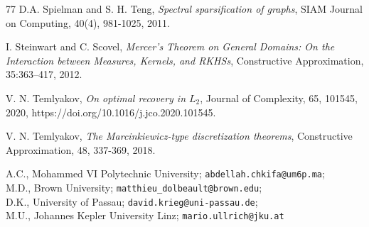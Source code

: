 \documentclass[a4paper,11pt]{article}
\renewcommand{\(}{\left (}
\renewcommand{\)}{\right )}
\newcommand{\<}{\langle}
\renewcommand{\>}{\rangle}
\theoremstyle{definition}
\begin{document}
\begin{thebibliography}{77}
D.A. Spielman and S. H. Teng, {\it Spectral sparsification of graphs}, SIAM Journal on Computing, 40(4), 981-1025, 2011.

I. Steinwart and C. Scovel, 
{\it Mercer’s Theorem on General Domains: On the Interaction between Measures, Kernels, and RKHSs},
Constructive Approximation, 35:363--417, 2012.

 V. N. Temlyakov, {\it On optimal recovery in $L_2$},  
Journal of Complexity, 65, 101545, 2020, https://doi.org/10.1016/j.jco.2020.101545.

 V. N. Temlyakov, 
{\it The Marcinkiewicz-type discretization theorems}, 
Constructive Approximation, 48, 337-369, 2018.


\end{thebibliography}

\bigskip

\noindent
A.C., Mohammed VI Polytechnic University; \texttt{abdellah.chkifa@um6p.ma};\\
M.D., Brown University; \texttt{matthieu\_dolbeault@brown.edu};\\
D.K., University of Passau; \texttt{david.krieg@uni-passau.de};\\
M.U., Johannes Kepler University Linz; \texttt{mario.ullrich@jku.at}
\end{document}

